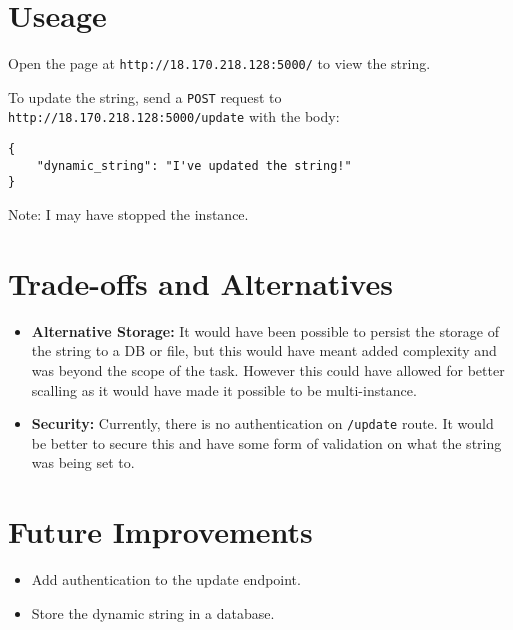 \documentclass[12pt]{article}
\begin{document}
\section{Useage}
Open the page at \texttt{http://18.170.218.128:5000/} to view the string. 

To update the string, send a \texttt{POST} request to \texttt{http://18.170.218.128:5000/update} with the body:
\begin{lstlisting}
{
    "dynamic_string": "I've updated the string!"
}
\end{lstlisting}

Note: I may have stopped the instance.

\section{Trade-offs and Alternatives}
\begin{itemize}
    \item \textbf{Alternative Storage:} It would have been possible to persist the storage of the string to a DB or file, but this would have meant added complexity and was beyond the scope of the task. However this could have allowed for better scalling as it would have made it possible to be multi-instance.
    \item \textbf{Security:} Currently, there is no authentication on \texttt{/update} route. It would be better to secure this and have some form of validation on what the string was being set to. 
\end{itemize}

\section{Future Improvements}
\begin{itemize}
    \item Add authentication to the update endpoint.
    \item Store the dynamic string in a database.
\end{itemize}
\end{document}
